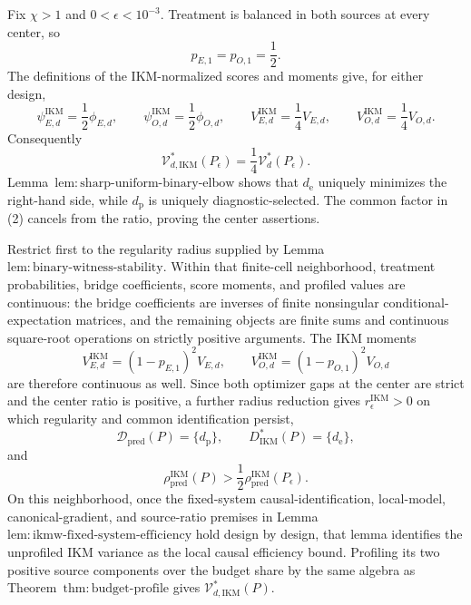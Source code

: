 Fix \(\chi>1\) and \(0<\epsilon<10^{-3}\).  Treatment is balanced in both sources at every center, so
\[
 p_{E,1}=p_{O,1}=\frac12.
\]
The definitions of the IKM-normalized scores and moments give, for either design,
\[
 \psi_{E,d}^{\mathrm{IKM}}=\frac12\phi_{E,d},
 \qquad
 \psi_{O,d}^{\mathrm{IKM}}=\frac12\phi_{O,d},
 \qquad
 V_{E,d}^{\mathrm{IKM}}=\frac14V_{E,d},
 \qquad
 V_{O,d}^{\mathrm{IKM}}=\frac14V_{O,d}. \tag{1}
\]
Consequently
\[
 \mathcal V_{d,\mathrm{IKM}}^*(P_\epsilon)
 =\frac14\mathcal V_d^*(P_\epsilon). \tag{2}
\]
Lemma~\(\mathrm{lem{:}sharp\text{-}uniform\text{-}binary\text{-}elbow}\) shows that \(d_{\mathrm e}\) uniquely minimizes the right-hand side, while \(d_{\mathrm p}\) is uniquely diagnostic-selected.  The common factor in (2) cancels from the ratio, proving the center assertions.

Restrict first to the regularity radius supplied by Lemma~\(\mathrm{lem{:}binary\text{-}witness\text{-}stability}\).  Within that finite-cell neighborhood, treatment probabilities, bridge coefficients, score moments, and profiled values are continuous: the bridge coefficients are inverses of finite nonsingular conditional-expectation matrices, and the remaining objects are finite sums and continuous square-root operations on strictly positive arguments.  The IKM moments
\[
 V_{E,d}^{\mathrm{IKM}}=(1-p_{E,1})^2V_{E,d},
 \qquad
 V_{O,d}^{\mathrm{IKM}}=(1-p_{O,1})^2V_{O,d}
\]
are therefore continuous as well.  Since both optimizer gaps at the center are strict and the center ratio is positive, a further radius reduction gives \(r_\epsilon^{\mathrm{IKM}}>0\) on which regularity and common identification persist,
\[
 \mathcal D_{\mathrm{pred}}(P)=\{d_{\mathrm p}\},
 \qquad
 D_{\mathrm{IKM}}^*(P)=\{d_{\mathrm e}\},
\]
and
\[
 \rho_{\mathrm{pred}}^{\mathrm{IKM}}(P)
 >\frac12\rho_{\mathrm{pred}}^{\mathrm{IKM}}(P_\epsilon).
\]
On this neighborhood, once the fixed-system causal-identification, local-model, canonical-gradient, and source-ratio premises in Lemma~\(\mathrm{lem{:}ikmw\text{-}fixed\text{-}system\text{-}efficiency}\) hold design by design, that lemma identifies the unprofiled IKM variance as the local causal efficiency bound.  Profiling its two positive source components over the budget share by the same algebra as Theorem~\(\mathrm{thm{:}budget\text{-}profile}\) gives \(\mathcal V_{d,\mathrm{IKM}}^*(P)\).